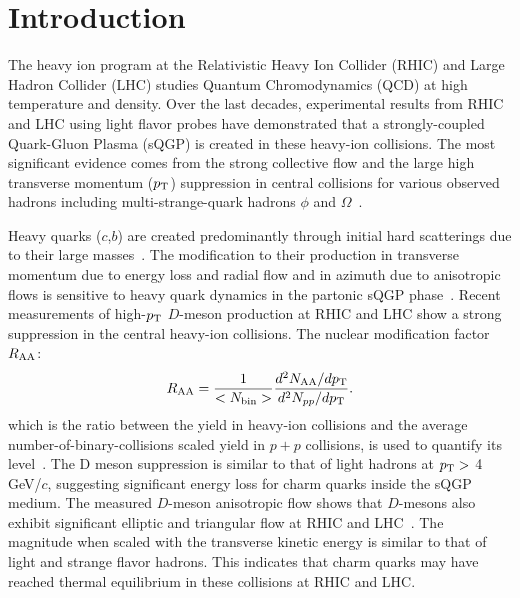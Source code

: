 \documentclass[%
 reprint,	
 amsmath,amssymb,
 aps,
 prc,
]{revtex4-1}
\begin{document}
\maketitle
%
%
%

\section{\label{sec:introduction}Introduction}
The heavy ion program at the Relativistic Heavy Ion Collider (RHIC) and Large Hadron Collider (LHC) studies Quantum Chromodynamics (QCD) at high temperature and density. Over the last decades, experimental results from RHIC and LHC using light flavor probes have demonstrated that a strongly-coupled Quark-Gluon Plasma (sQGP) is created in these heavy-ion collisions. The most significant evidence comes from the strong collective flow and the large high transverse momentum ($p_{\rm T}$) suppression in central collisions for various observed hadrons including multi-strange-quark hadrons $\phi$ and $\Omega$~\cite{StarWhitePaper,PhenixWhitePaper,LhcSummary,Adamczyk:2015ukd,Abelev:2014pua}.

Heavy quarks ($c$,$b$) are created predominantly through initial hard scatterings due to their large masses~\cite{Ziwei_Lin,Cacciari}. The modification to their production in transverse momentum due to energy loss and radial flow and in azimuth due to anisotropic flows is sensitive to heavy quark dynamics in the partonic sQGP phase~\cite{Moore}. Recent measurements of high-$p_{\rm T}$ $D$-meson production at RHIC and LHC show a strong suppression in the central heavy-ion collisions. The nuclear modification factor $R_{\rm AA}$:
\begin{equation}
  R_{\rm AA} = \frac{1}{<N_{\rm bin}>} \frac{d^2N_{\rm AA}/dp_{\rm T}}{d^2N_{pp}/dp_{\rm T}}.
\label{equ:equation0}
\end{equation}
which is the ratio between the yield in heavy-ion collisions and the average number-of-binary-collisions scaled yield in $p + p$ collisions, is used to quantify its level~\cite{Alice_D_RAA_1,Alice_D_RAA_2,CMS_D_RAA_5TeV,Star_D_RAA}. The D meson suppression is similar to that of light hadrons at $p_{\rm T}>$ 4\,GeV/$c$, suggesting significant energy loss for charm quarks inside the sQGP medium. The measured $D$-meson anisotropic flow shows that $D$-mesons also exhibit significant elliptic and triangular flow at RHIC and LHC~\cite{Alice_D_v2_276TeV_PRL,Alice_D_v2_276TeV_PRC,CMS_D_vn_5TeV,Star_D_v2}. The magnitude when scaled with the transverse kinetic energy is similar to that of light and strange flavor hadrons. This indicates that charm quarks may have reached thermal equilibrium in these collisions at RHIC and LHC.
\end{document}
